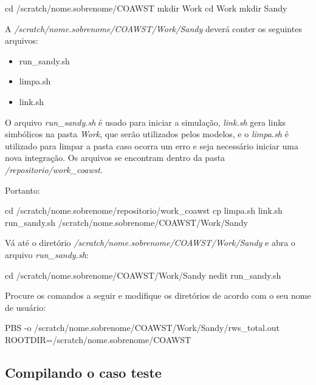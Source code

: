 \begin{bashcode}
cd /scratch/nome.sobrenome/COAWST
mkdir Work
cd Work
mkdir Sandy
\end{bashcode}
\bigskip

\noindent A \textit{/scratch/nome.sobrenome/COAWST/Work/Sandy} deverá conter os seguintes arquivos:
\bigskip

\begin{itemize}
\item run\_sandy.sh
\item limpa.sh
\item link.sh
\end{itemize}
\bigskip

\noindent O arquivo \textit{run\_sandy.sh} é usado para iniciar a simulação, \textit{link.sh} gera links simbólicos na pasta \textit{Work}, que serão utilizados pelos modelos, e o \textit{limpa.sh} é utilizado para limpar a pasta caso ocorra um erro e seja necessário iniciar uma nova integração. Os arquivos se encontram dentro da pasta \textit{/repositorio/work\_coawst}.
\bigskip

\noindent Portanto:

\bigskip

\begin{bashcode}
cd /scratch/nome.sobrenome/repositorio/work_coawst
cp limpa.sh link.sh run_sandy.sh /scratch/nome.sobrenome/COAWST/Work/Sandy
\end{bashcode}
\bigskip

\noindent Vá até o diretório \textit{/scratch/nome.sobrenome/COAWST/Work/Sandy} e abra o arquivo \textit{run\_sandy.sh}:
\bigskip

\begin{bashcode}
cd /scratch/nome.sobrenome/COAWST/Work/Sandy
nedit run_sandy.sh
\end{bashcode}
\bigskip

\noindent Procure os comandos a seguir e modifique os diretórios de acordo com o seu nome de usuário:
\bigskip

\begin{bashcode}
PBS -o /scratch/nome.sobrenome/COAWST/Work/Sandy/rws_total.out
ROOTDIR=/scratch/nome.sobrenome/COAWST
\end{bashcode}
\bigskip


\subsection{Compilando o caso teste}
\bigskip

